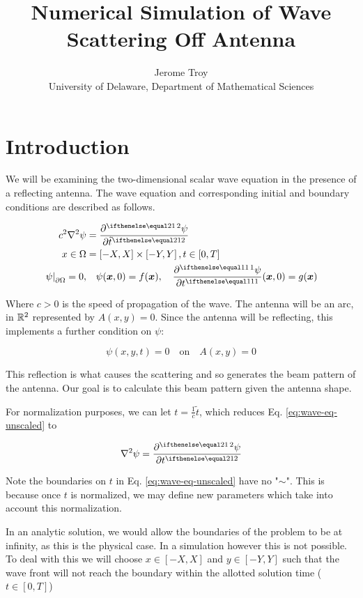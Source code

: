 \documentclass{article}
\title{Numerical Simulation of Wave Scattering Off Antenna}
\author{Jerome Troy \\
University of Delaware, Department of Mathematical Sciences}
\date{}
\begin{document}
\maketitle

\tableofcontents

\newpage

\section{Introduction}

We will be examining the two-dimensional scalar wave equation in
the presence of a reflecting antenna.  The wave equation and corresponding
initial and boundary conditions are described as follows.

\begin{equation}
  \label{eq:wave-eq-unscaled}
  \begin{split}
  c^2 \nabla^2 \psi & = \pder[2]{\psi}{\tilde{t}} \\
  x \in \Omega & = \left[-X,X\right] \times \left[-Y,Y\right],
  t \in \left[0,T\right] \\
  \left.\psi\right|_{\partial \Omega} = 0, & \quad
  \psi(\vec{x},0) = f(\vec{x}), \quad \pder{\psi}{t}(\vec{x},0) = g(\vec{x})
  \end{split}
\end{equation}

Where $c > 0$ is the speed of propagation of the wave.
The antenna will be an arc, in $\mathbb{R}^2$ represented by $A(x,y) = 0$.
Since the antenna will be reflecting, this implements a further condition on
$\psi$:

$$\psi(x,y,t) = 0 \quad \text{on} \quad A(x,y) = 0$$

This reflection is what causes the scattering and so generates the
beam pattern of the antenna.
Our goal is to calculate this beam pattern given the antenna shape.

For normalization purposes, we can let $t = \frac{1}{c}\tilde{t}$, which
reduces Eq. \ref{eq:wave-eq-unscaled} to

\begin{equation}
  \label{eq:wave-eq}
  \nabla^2 \psi = \pder[2]{\psi}{t}
\end{equation}

Note the boundaries on $t$ in Eq. \ref{eq:wave-eq-unscaled} have no "$\sim$".
This is because once $t$ is normalized, we may define new parameters which
take into account this normalization.

In an analytic solution, we would allow the boundaries of the problem to be
at infinity, as this is the physical case.  In a simulation however this is
not possible.  To deal with this we will choose $x \in \left[-X,X\right]$ and
$y \in \left[-Y,Y\right]$ such that the wave front will not reach the
boundary within the allotted solution time ($t \in \left[0,T\right]$)
\end{document}
